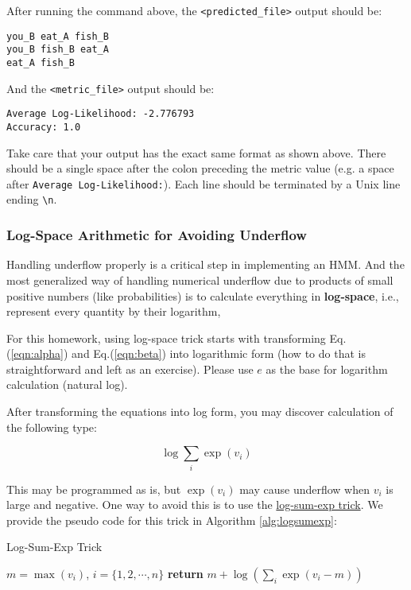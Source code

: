 \documentclass[11pt,addpoints,answers]{exam}
\numberwithin{equation}{section} %
\numberwithin{figure}{section} %
\numberwithin{table}{section} %
\begin{document}
After running the command above, the \texttt{<predicted\_file>} output should be:

\begin{lstlisting}
you_B eat_A fish_B
you_B fish_B eat_A
eat_A fish_B
\end{lstlisting}

And the \texttt{<metric\_file>} output should be:

\begin{lstlisting}
Average Log-Likelihood: -2.776793
Accuracy: 1.0
\end{lstlisting}

Take care that your output has the exact same format as shown above. There should be a single space after the colon preceding the metric value (e.g. a space after \lstinline{Average Log-Likelihood:}). Each line should be terminated by a Unix line ending \lstinline{\n}.



\subsubsection{Log-Space Arithmetic for Avoiding Underflow}
\label{sec:underflow}

Handling underflow properly is a critical step in implementing an HMM. And the most generalized way of handling numerical underflow due to products of small positive numbers (like probabilities) is to calculate everything in \textbf{log-space}, i.e., represent every quantity by their logarithm, 

For this homework, using log-space trick starts with transforming Eq.(\ref{eqn:alpha}) and Eq.(\ref{eqn:beta}) into logarithmic form (how to do that is straightforward and left as an exercise). Please use $e$ as the base for logarithm calculation (natural log).

After transforming the equations into log form, you may discover calculation of the following type:

$$ \log \sum_i \exp{(v_i)}$$

This may be programmed as is, but $\exp{(v_i)}$ may cause underflow when $v_i$ is large and negative. One way to avoid this is to use the \href{https://www.xarg.org/2016/06/the-log-sum-exp-trick-in-machine-learning/}{log-sum-exp trick}. We provide the pseudo code for this trick in Algorithm \ref{alg:logsumexp}:

\begin{algorithm}[H]
  \caption{Log-Sum-Exp Trick}
  \label{alg:logsumexp}
  \begin{algorithmic}[1]
        \State $m = \max(v_i)$,  $i=\{1, 2,\cdots, n\}$
        \State \textbf{return} $m + \log(\sum_i\exp(v_i-m))$
    \EndProcedure
  \end{algorithmic}
\end{algorithm}    
\end{document}

